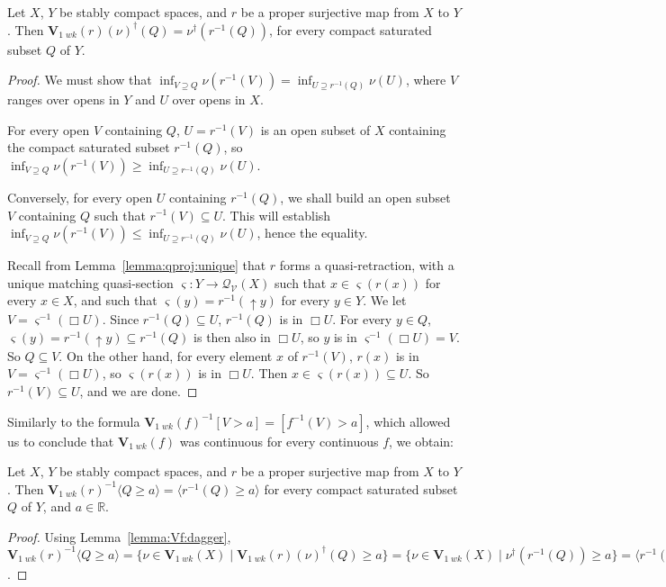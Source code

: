 \documentclass{LMCS}
\newcommand\Smyth{\mathcal Q}
\newcommand\V{{\mathcal V}}
\newcommand\SV{\Smyth_\V}
\newcommand\upc{\mathop{\uparrow}\nolimits}
\newcommand\qs{\varsigma}
\newcommand\Val{\mathbf V}
\newcommand{\real}{\mathbb{R}}
\begin{document}
\begin{lem}
  \label{lemma:Vf:dagger}
  Let $X$, $Y$ be stably compact spaces, and $r$ be a proper
  surjective map from $X$ to $Y$.  Then $\Val_{1\;wk} (r)
  (\nu)^\dagger (Q) = \nu^\dagger (r^{-1} (Q))$, for every compact
  saturated subset $Q$ of $Y$.
\end{lem}
\begin{proof}
  We must show that $\inf_{V \supseteq Q} \nu (r^{-1} (V)) = \inf_{U
    \supseteq r^{-1} (Q)} \nu (U)$, where $V$ ranges over opens in $Y$
  and $U$ over opens in $X$.

  For every open $V$ containing $Q$, $U = r^{-1} (V)$ is an open
  subset of $X$ containing the compact saturated subset $r^{-1} (Q)$,
  so $\inf_{V \supseteq Q} \nu (r^{-1} (V)) \geq \inf_{U \supseteq
    r^{-1} (Q)} \nu (U)$.

  Conversely, for every open $U$ containing $r^{-1} (Q)$, we shall
  build an open subset $V$ containing $Q$ such that $r^{-1} (V)
  \subseteq U$.  This will establish $\inf_{V \supseteq Q} \nu (r^{-1}
  (V)) \leq \inf_{U \supseteq r^{-1} (Q)} \nu (U)$, hence the
  equality.

  Recall from Lemma~\ref{lemma:qproj:unique} that $r$ forms a
  quasi-retraction, with a unique matching quasi-section $\qs : Y \to
  \SV (X)$ such that $x \in \qs (r (x))$ for every $x \in X$, and such
  that $\qs (y) = r^{-1} (\upc y)$ for every $y \in Y$.  We let $V =
  \qs^{-1} (\Box U)$.  Since $r^{-1} (Q) \subseteq U$, $r^{-1} (Q)$ is
  in $\Box U$.  For every $y \in Q$, $\qs (y) = r^{-1} (\upc y)
  \subseteq r^{-1} (Q)$ is then also in $\Box U$, so $y$ is in
  $\qs^{-1} (\Box U) = V$.  So $Q \subseteq V$.  On the other hand,
  for every element $x$ of $r^{-1} (V)$, $r (x)$ is in $V = \qs^{-1}
  (\Box U)$, so $\qs (r (x))$ is in $\Box U$.  Then $x \in \qs (r (x))
  \subseteq U$.  So $r^{-1} (V) \subseteq U$, and we are done.
\end{proof}

Similarly to the formula $\Val_{1\;wk} (f)^{-1} [V > a] = [f^{-1} (V)
> a]$, which allowed us to conclude that $\Val_{1\;wk} (f)$ was
continuous for every continuous $f$, we obtain:
\begin{lem}
  \label{lemma:Vf:dagger:inv}
  Let $X$, $Y$ be stably compact spaces, and $r$ be a proper
  surjective map from $X$ to $Y$.  Then $\Val_{1\;wk} (r)^{-1} \langle
  Q \geq a \rangle = \langle r^{-1} (Q) \geq a \rangle$ for every
  compact saturated subset $Q$ of $Y$, and $a \in \real$.
\end{lem}
\begin{proof}
  Using Lemma~\ref{lemma:Vf:dagger}, $\Val_{1\;wk} (r)^{-1} \langle Q
  \geq a \rangle = \{\nu \in \Val_{1\;wk} (X) \mid \Val_{1\;wk} (r)
  (\nu)^\dagger (Q) \geq a\} = \{\nu \in \Val_{1\;wk} (X) \mid
  \nu^\dagger (r^{-1} (Q)) \geq a\} = \langle r^{-1} (Q) \geq a
  \rangle$.
\end{proof}
\end{document}
